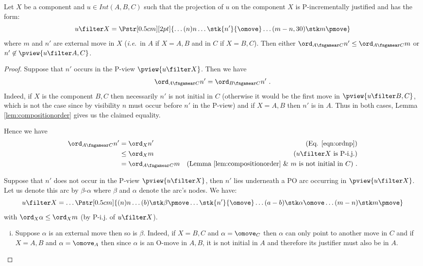 \begin{lemma}
\label{lem:compos_auxiliary_lemma}
Let $X$ be a component and $u \in Int(A,B,C)$ such that
the projection of $u$ on the component $X$ is P-incrementally justified and has the form:
$$ u \filter X =
\Pstr[0.5cm][2pt]{ \ldots (n){n}  \ldots
 {\stk {n'}{\omove}}  \ldots  (m-n,30){\stk m {\pmove}}
}$$
where $m$ and $n'$ are external move in $X$ ({\it i.e.}~in $A$ if $X =A,B$ and in $C$ if $X=B,C$).
Then  either $\ord_{A\fngamear C} n' \leq
\ord_{A\fngamear C} m$ or $n' \not \in \pview{u\filter A,C}$.
\end{lemma}
\begin{proof}

Suppose that $n'$ occurs in the P-view $\pview{u\filter X}$. Then we have
\begin{equation}
\ord_{A\fngamear C} n'  = \ord_{B\fngamear C} n' \ . \label{eqn:ordnp}
\end{equation}
Indeed, if $X$ is the component $B,C$ then necessarily $n'$ is not initial in $C$ (otherwise it would be the first move in $\pview{u \filter B,C}$, which is not the case since by visibility $n$ must occur before $n'$ in the P-view) and
if $X=A,B$ then $n'$ is in $A$. Thus in both cases, Lemma \ref{lem:compositionorder} gives us the claimed equality.

Hence we have
\begin{align*}
\ord_{A\fngamear C} n'
& = \ord_{X} n' & \mbox{(Eq.
\ref{eqn:ordnp})} \\
& \leq \ord_{X} m & \mbox{($u\filter X$ is P-i.j.)} \\
& = \ord_{A\fngamear C} m & \mbox{(Lemma \ref{lem:compositionorder} \& $m$ is not initial in $C$)} \ .
\end{align*}

Suppose that $n'$ does not occur in the P-view $\pview{u \filter X}$, then $n'$ lies underneath a PO arc occurring in $\pview{u \filter X}$. Let us denote this arc by $\beta$-$\alpha$ where $\beta$ and $\alpha$ denote the arc's nodes. We have:
$$ u \filter X = \ldots
\Pstr[0.5cm]{
 (n){n} \ldots (b){\stk\beta \pmove} \ldots \stk{n'} {\omove}
\ldots (a-b){\stk\alpha \omove}  \ldots (m-n){\stk m {\pmove} }
} $$
with $\ord_X \alpha \leq \ord_X m$ (by P-i.j. of $u \filter X$).

\begin{enumerate}[i.]
\item Suppose $\alpha$ is an external move then so is $\beta$. Indeed, if $X=B,C$ and $\alpha = \omove_C$ then $\alpha$ can only point to another move in $C$ and
if $X=A,B$ and $\alpha = \omove_A$ then since $\alpha$ is an O-move in $A,B$, it is not initial in $A$ and therefore its justifier must also be in $A$.


\end{enumerate}
\end{proof}
